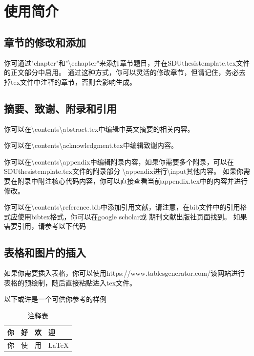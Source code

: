 
\chapter{使用简介}

\section{章节的修改和添加}
你可通过"chapter{}"和"\textbackslash echapter{}"来添加章节题目，并在SDUthesistemplate.tex文件的正文部分中启用。
通过这种方式，你可以灵活的修改章节，但请记住，务必去掉tex文件中注释的章节，否则会影响生成。

\section{摘要、致谢、附录和引用}
你可以在\textbackslash contents\textbackslash abstract.tex中编辑中英文摘要的相关内容。

你可以在\textbackslash contents\textbackslash acknowledgment.tex中编辑致谢内容。

你可以在\textbackslash contents\textbackslash appendix中编辑附录内容，如果你需要多个附录，可以在SDUthesistemplate.tex文件的附录部分
\textbackslash appendix进行\textbackslash input其他内容。
如果你需要在附录中附注核心代码内容，你可以直接查看当前appendix.tex中的内容并进行修改。

你可以在\textbackslash contents\textbackslash reference.bib中添加引用文献，请注意，在bib文件中的引用格式应使用bibtex格式，你可以在google scholar或
期刊文献出版社页面找到。
如果需要引用，请参考以下代码\cite{phattharasupakun2020impact}

\section{表格和图片的插入}
如果你需要插入表格，你可以使用https://www.tablesgenerator.com/该网站进行表格的预绘制，随后直接粘贴进入tex文件。

以下或许是一个可供你参考的样例
\begin{table}[htbp]
    \centering
\begin{tabular}{|p{3em} p{18em} p{3em} p{8em}|}
    \hline
    你 & 好 & 欢 & 迎\\ \hline
    你 & 使 & 用 & \LaTeX \\
    \hline
\end{tabular}
    \caption{注释表}
\end{table}

